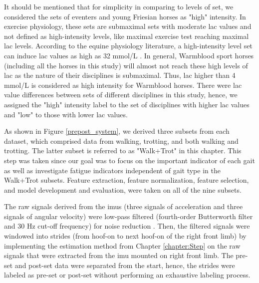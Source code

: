 It should be mentioned that for simplicity in comparing to levels of \gls{set}, we considered the \gls{set}s of eventers and young Friesian horses as "high" intensity. In exercise physiology, these \gls{set}s are submaximal \gls{set}s with moderate \gls{lac} values and not defined as high-intensity levels, like maximal exercise test reaching maximal \gls{lac} levels. According to the equine physiology literature, a high-intensity level \gls{set} can induce \gls{lac} values as high as 32 \gls{mmol/L} \cite{patrichttps://doi.org/10.1111/j.2042-3306.1988.tb01470.x}. In general, Warmblood sport horses (including all the horses in this study) will almost not reach these high levels of \gls{lac} as the nature of their disciplines is submaximal. Thus, \gls{lac} higher than 4 \gls{mmol/L} is considered as high intensity for Warmblood horses. There were \gls{lac} value differences between \gls{set}s of different disciplines in this study, hence, we assigned the "high" intensity label to the \gls{set} of disciplines with higher \gls{lac} values and "low" to those with lower \gls{lac} values.
 
 As shown in Figure \ref{prepost_system}, we derived three subsets from each dataset, which comprised data from walking, trotting, and both walking and trotting. The latter subset is referred to as "Walk+Trot" in this chapter. This step was taken since our goal was to focus on the important indicator of each gait as well as investigate fatigue indicators independent of gait type in the Walk+Trot subsets. Feature extraction, feature normalization, feature selection, and model development and evaluation, were taken on all of the nine subsets. 


The raw signals derived from the \gls{imu}s (three signals of acceleration and three signals of angular velocity) were low-pass filtered (fourth-order Butterworth filter and 30 Hz cut-off frequency) for noise reduction \cite{456}. Then, the filtered signals were windowed into strides (from hoof-on to next hoof-on of the right front limb) by implementing the estimation method from Chapter \ref{chapter:Step} on the raw signals that were extracted from the \gls{imu} mounted on right front limb. The pre-\gls{set} and post-\gls{set} data were separated from the start, hence, the strides were labeled as pre-\gls{set} or post-\gls{set} without performing an exhaustive labeling process. 

